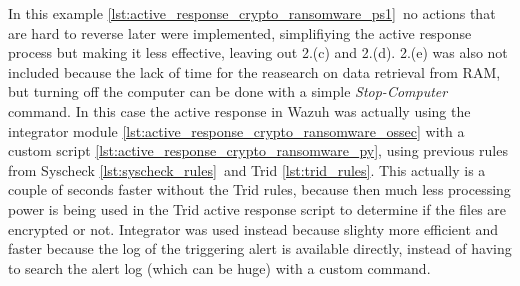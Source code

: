 \linej
In this example \ref{lst:active_response_crypto_ransomware_ps1}\ no actions that are hard to reverse later were implemented, simplifiying the active response process but making it less effective, leaving out 2.(c) and 2.(d). 2.(e) was also not included because the lack of time for the reasearch on data retrieval from RAM, but turning off the computer can be done with a simple \textit{Stop-Computer} command.
\linej
\linej
In this case the active response in Wazuh was actually using the integrator module \ref{lst:active_response_crypto_ransomware_ossec} with a custom script \ref{lst:active_response_crypto_ransomware_py}, using previous rules from Syscheck \ref{lst:syscheck_rules}\ and Trid \ref{lst:trid_rules}.
This actually is a couple of seconds faster without the Trid rules, because then much less processing power is being used in the Trid active response script to determine if the files are encrypted or not.
Integrator\cite{integrator} was used instead because slighty more efficient and faster because the log of the triggering alert is available directly, instead of having to search the alert log (which can be huge) with a custom command.


